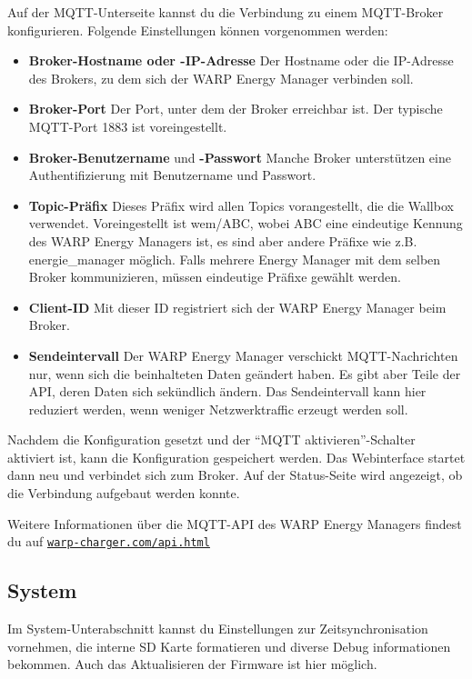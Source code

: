 \documentclass[a4paper,10pt]{article}
\newcommand{\gfx}[1]{\texttt{[image: \#1]}}
\newcommand\rurl[2]{%
  \href{#1}{\nolinkurl{#2}}%
}
\begin{document}
\begin{multicols*}{2}
	Auf der MQTT-Unterseite kannst du die Verbindung zu einem MQTT-Broker konfigurieren. Folgende Einstellungen können vorgenommen werden:
	\begin{itemize}
		\item \textbf{Broker-Hostname oder -IP-Adresse} Der Host\-name oder die
		IP-Adresse des Brokers, zu dem sich der WARP Energy Manager verbinden soll.
		\item \textbf{Broker-Port} Der Port, unter dem der Broker erreichbar ist. Der typische MQTT-Port 1883 ist voreingestellt.
		\item \textbf{Broker-Benutzername} und \textbf{-Passwort} Manche Broker unterstützen eine Authentifizierung mit Benutzername und Passwort.
		\item \textbf{Topic-Präfix} Dieses Präfix wird allen Topics vorangestellt, die die Wallbox verwendet.
		      Voreingestellt ist wem/ABC, wobei ABC eine eindeutige Kennung des
			  WARP Energy Managers ist,
		      es sind aber andere Präfixe wie z.B. energie\_manager möglich.
		      Falls mehrere Energy Manager mit dem selben Broker kommunizieren,
		      müssen eindeutige Präfixe gewählt werden.
		\item \textbf{Client-ID} Mit dieser ID registriert sich der WARP Energy Manager beim Broker.
		\item \textbf{Sendeintervall} Der WARP Energy Manager verschickt MQTT-Nachrichten nur, wenn sich die beinhalteten Daten geändert haben.
			Es gibt aber Teile der API, deren Daten sich sekündlich ändern. Das Sendeintervall kann hier reduziert werden, wenn weniger Netzwerktraffic
			erzeugt werden soll.
	\end{itemize}
	Nachdem die Konfiguration gesetzt und der \enquote{MQTT aktivieren}-Schalter aktiviert ist, kann die Konfiguration gespeichert werden.
	Das Webinterface startet dann neu und verbindet sich zum Broker.
	Auf der Status-Seite wird angezeigt, ob die Verbindung aufgebaut werden konnte.

	Weitere Informationen über die MQTT-API des WARP Energy Managers findest du auf \rurl{https://warp-charger.com/api.html}{warp-charger.com/api.html}

	\subsection{System}
	Im System-Unterabschnitt kannst du Einstellungen zur Zeitsynchronisation
	vornehmen, die interne SD Karte formatieren und diverse Debug informationen
	bekommen. Auch das Aktualisieren der Firmware ist hier möglich.


\end{multicols*}
\end{document}

